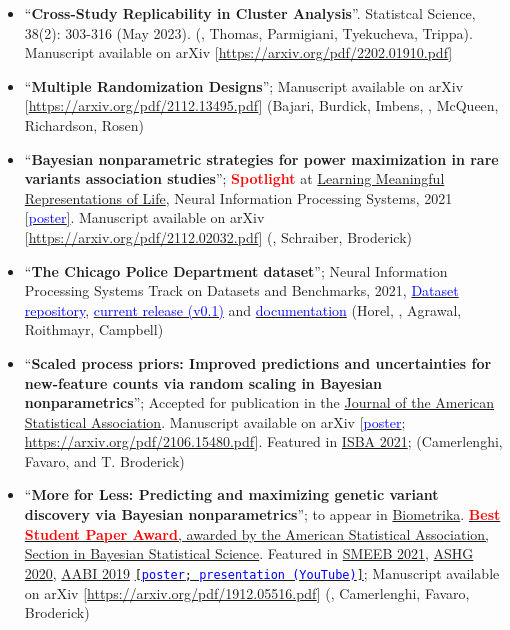 \documentclass[10pt, a4paper]{article}
\begin{document}
\begin{itemize}
	\item``\textbf{Cross-Study Replicability in Cluster Analysis}''. Statistcal Science, 38(2): 303-316 (May 2023).  (\mm, Thomas, Parmigiani, Tyekucheva, Trippa). Manuscript available on arXiv [\url{https://arxiv.org/pdf/2202.01910.pdf}] 
	\item ``\textbf{Multiple Randomization Designs}''; Manuscript available on arXiv [\url{https://arxiv.org/pdf/2112.13495.pdf}] (Bajari, Burdick, Imbens, \mm, McQueen, Richardson, Rosen)
	\item ``\textbf{Bayesian nonparametric strategies for power maximization in rare variants association studies}''; \textcolor{red}{\textbf{Spotlight}} at \href{https://www.lmrl.org/}{Learning Meaningful Representations of Life},  Neural Information Processing Systems, 2021 [\href{https://lorenzomasoero.com/files/LRML_21_poster.pdf}{\textcolor{blue}{poster}]}. Manuscript available on arXiv [\url{https://arxiv.org/pdf/2112.02032.pdf}] (\mm, Schraiber, Broderick)
	\item ``\textbf{The Chicago Police Department dataset}''; Neural Information Processing Systems Track on Datasets and Benchmarks, 2021, \href{https://github.com/chicago-police-violence/data}{\textcolor{blue}{Dataset repository}}, \href{https://github.com/chicago-police-violence/data/releases/tag/v0.1}{\textcolor{blue}{current release (v0.1)}} and \href{https://github.com/chicago-police-violence/data/releases/download/v0.1/documentation.pdf}{\textcolor{blue}{documentation}} (Horel, \mm, Agrawal, Roithmayr, Campbell)
	\item ``\textbf{Scaled process priors: Improved predictions and uncertainties for new-feature counts via random scaling in Bayesian nonparametrics}''; Accepted for publication in the \href{https://www.tandfonline.com/doi/full/10.1080/01621459.2022.2115918}{Journal of the American Statistical Association}. Manuscript available on arXiv [\href{https://lorenzomasoero.com/files/spp_poster.pdf}{\textcolor{blue}{poster}}; \url{https://arxiv.org/pdf/2106.15480.pdf}]. Featured in \href{https://whova.com/portal/webapp/isbaw_202106/}{ISBA 2021}; (Camerlenghi, Favaro, \mm and T. Broderick)
	\item ``\textbf{More for Less: Predicting and maximizing genetic variant discovery via Bayesian nonparametrics}''; to appear in \href{https://academic.oup.com/biomet/advance-article-abstract/doi/10.1093/biomet/asab012/6146908?redirectedFrom=PDF}{Biometrika}.  \href{https://community.amstat.org/sbss/home}{\textbf{\textcolor{red}{Best Student Paper Award}}, awarded by the American Statistical Association, Section in Bayesian Statistical Science}. Featured in \href{https://liphlab.github.io/SMEEB2021/files/SMEEB2021_abstract_booklet.pdf}{SMEEB 2021}, \href{https://www.ashg.org/meetings/2020meeting}{ASHG 2020},  \href{https://openreview.net/pdf?id=B1l8tyhEYr}{AABI 2019} \href{https://lorenzomasoero.com/files/more_poster.pdf}{\texttt{[\textcolor{blue}{poster}; \href{https://www.youtube.com/watch?v=OQzyWf-OXK4&ab_channel=TamaraBroderick}{\textcolor{blue}{presentation (YouTube)}}]}}; Manuscript available on arXiv [\url{https://arxiv.org/pdf/1912.05516.pdf}] (\mm, Camerlenghi, Favaro, Broderick)

\end{itemize}
\end{document}
